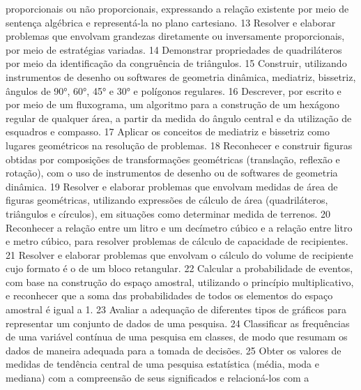 {{{{{							proporcionais ou não proporcionais, expressando a relação existente por meio de sentença
							algébrica e representá-la no plano cartesiano.
						}
						{13}{%
							Resolver e elaborar problemas que envolvam grandezas diretamente ou
							inversamente proporcionais, por meio de estratégias variadas.
						}
						{14}{%
							Demonstrar propriedades de quadriláteros por meio da identificação da
							congruência de triângulos.
						}
						{15}{%
							Construir, utilizando instrumentos de desenho ou softwares de geometria
							dinâmica, mediatriz, bissetriz, ângulos de 90°, 60°, 45° e 30° e polígonos regulares.
						}
						{16}{%
							Descrever, por escrito e por meio de um fluxograma, um algoritmo para a
							construção de um hexágono regular de qualquer área, a partir da medida do ângulo central e
							da utilização de esquadros e compasso.
						}
						{17}{%
							Aplicar os conceitos de mediatriz e bissetriz como lugares geométricos na
							resolução de problemas.
						}
						{18}{%
							Reconhecer e construir figuras obtidas por composições de transformações
							geométricas (translação, reflexão e rotação), com o uso de instrumentos de desenho ou de
							softwares de geometria dinâmica.
						}
						{19}{%
							Resolver e elaborar problemas que envolvam medidas de área de figuras
							geométricas, utilizando expressões de cálculo de área (quadriláteros, triângulos e círculos), em
							situações como determinar medida de terrenos.
						}
						{20}{%
							Reconhecer a relação entre um litro e um decímetro cúbico e a relação entre litro
							e metro cúbico, para resolver problemas de cálculo de capacidade de recipientes.
						}
						{21}{%
							Resolver e elaborar problemas que envolvam o cálculo do volume de recipiente
							cujo formato é o de um bloco retangular.
						}
						{22}{%
							Calcular a probabilidade de eventos, com base na construção do espaço amostral,
							utilizando o princípio multiplicativo, e reconhecer que a soma das probabilidades de todos os
							elementos do espaço amostral é igual a 1.
						}
						{23}{%
							Avaliar a adequação de diferentes tipos de gráficos para representar um conjunto
							de dados de uma pesquisa.
						}
						{24}{%
							Classificar as frequências de uma variável contínua de uma pesquisa em classes,
							de modo que resumam os dados de maneira adequada para a tomada de decisões.
						}
						{25}{%
							Obter os valores de medidas de tendência central de uma pesquisa estatística
							(média, moda e mediana) com a compreensão de seus significados e relacioná-los com a
}}}}}
